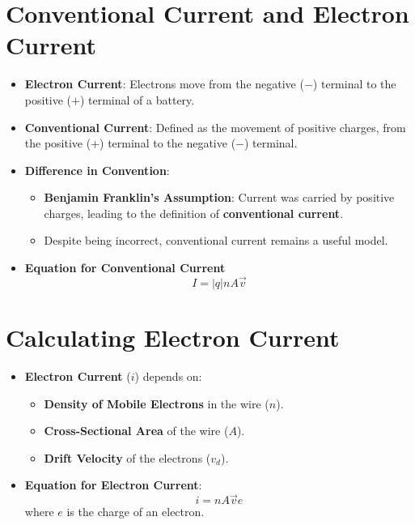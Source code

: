 \documentclass{article}
\begin{document}
\section*{Conventional Current and Electron Current}
\begin{itemize}
    \item \textbf{Electron Current}: Electrons move from the negative (\(-\)) terminal to the positive (\(+\)) terminal of a battery.
    \item \textbf{Conventional Current}: Defined as the movement of positive charges, from the positive (\(+\)) terminal to the negative (\(-\)) terminal.
    \item \textbf{Difference in Convention}:
    \begin{itemize}
        \item \textbf{Benjamin Franklin's Assumption}: Current was carried by positive charges, leading to the definition of \textbf{conventional current}.
        \item Despite being incorrect, conventional current remains a useful model.
    \end{itemize}
    \item \textbf{Equation for Conventional Current}
    \[
    I = |q|nA \vec{v}
    \]
\end{itemize}

\section*{Calculating Electron Current}
\begin{itemize}
    \item \textbf{Electron Current} (\(i\)) depends on:
    \begin{itemize}
        \item \textbf{Density of Mobile Electrons} in the wire (\(n\)).
        \item \textbf{Cross-Sectional Area} of the wire (\(A\)).
        \item \textbf{Drift Velocity} of the electrons (\(v_d\)).
    \end{itemize}
    \item \textbf{Equation for Electron Current}:
    \[
    i = n A \vec{v} e
    \]
    where \(e\) is the charge of an electron.
\end{itemize}
\end{document}
